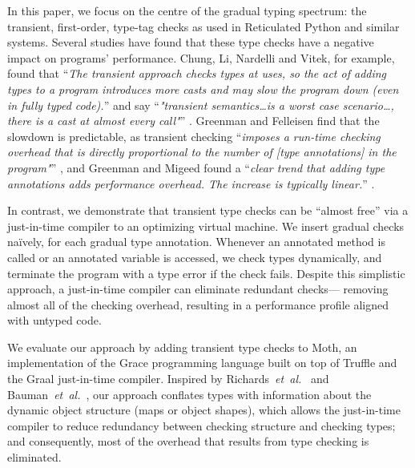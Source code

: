 In this paper, we focus on the centre of the gradual typing
spectrum: the transient, first-order, type-tag checks as used in
Reticulated Python and similar systems. 
Several studies have found
that these type checks have a negative impact on programs'
performance.
Chung, Li, Nardelli and Vitek, for example, found that 
``\textit{The transient approach checks types at uses, so the act of
  adding types to a program introduces more casts and may slow the
  program down (even in fully typed code).}'' and say 
``\textit{"transient semantics\ldots is a worst case scenario\ldots,
  there is a cast at almost every call"}'' \cite{kafka18}.
Greenman and Felleisen find that the slowdown is predictable, as
transient checking ``\textit{imposes a run-time checking overhead that
  is directly proportional to the number of [type annotations] in
  the program"}'' \cite{bensurvey18icfp}, and 
Greenman and Migeed found a ``\textit{clear trend
that adding type annotations adds performance overhead. The increase
is typically linear.}'' \cite{Greenman2018}.  


In contrast, we demonstrate that
transient type checks can be ``almost
free'' via a just-in-time compiler to an
optimizing virtual machine.
We insert 
gradual checks
na\"ively, for each gradual type 
annotation.
Whenever an annotated method is called or
an annotated variable is accessed,
we check types dynamically, and
terminate the program with a type error if the check fails.
Despite this simplistic approach, a just-in-time compiler can
eliminate redundant checks---%
removing almost all of the checking overhead,
resulting in a performance profile aligned with untyped code.

We evaluate our approach by adding transient type checks to Moth,
an implementation of the Grace programming language
built on top of Truffle
and the Graal just-in-time compiler\citep{Wurthinger2013,Wurthinger:2017:PPE}.
Inspired by Richards~\textit{et~al.}~\cite{Richards2017} and
Bauman~\textit{et~al.}~\cite{Bauman2017},
our approach conflates types
with information about the dynamic object structure 
(maps\citep{Self} or object shapes\citep{woss2014object}), 
which allows the just-in-time compiler
to reduce redundancy between checking structure
and checking types; and consequently, most of the overhead 
that results from type checking is eliminated.


